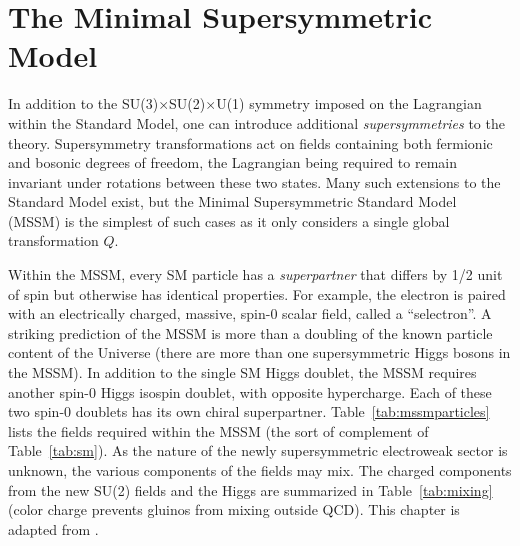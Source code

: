 \chapter{The Minimal Supersymmetric Model}
\label{chap:mssm}

In addition to the SU(3)$\times$SU(2)$\times$U(1) symmetry imposed on the Lagrangian within the Standard Model, one can introduce additional \textit{supersymmetries} to the theory. Supersymmetry transformations act on fields containing both fermionic and bosonic degrees of freedom, the Lagrangian being required to remain invariant under rotations between these two states. Many such extensions to the Standard Model exist, but the Minimal Supersymmetric Standard Model (MSSM) is the simplest of such cases as it only considers a single global transformation $Q$.

Within the MSSM, every SM particle has a \textit{superpartner} that differs by 1/2 unit of spin but otherwise has identical properties. For example, the electron is paired with an electrically charged, massive, spin-0 scalar field, called a ``selectron''.  A striking prediction of the MSSM is more than a doubling of the known particle content of the Universe (there are more than one supersymmetric Higgs bosons in the MSSM). In addition to the single SM Higgs doublet, the MSSM requires another spin-0 Higgs isospin doublet, with opposite hypercharge. Each of these two spin-0 doublets has its own chiral superpartner. Table~\ref{tab:mssmparticles} lists the fields required within the MSSM (the sort of complement of Table~\ref{tab:sm}). As the nature of the newly supersymmetric electroweak sector is unknown, the various components of the fields may mix. The charged components from the new SU(2) fields and the Higgs are summarized in Table~\ref{tab:mixing} (color charge prevents gluinos from mixing outside QCD). This chapter is adapted from \cite{susyprimer}.

